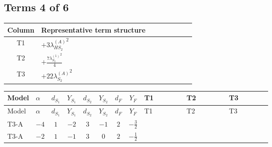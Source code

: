 \documentclass[8pt]{article}
\begin{document}
\begin{landscape}
\subsection*{Terms 4 of 6}
\begin{center}
\begin{tabular}{@{}c >{\raggedright\arraybackslash}p{0.82\linewidth}@{}}
\toprule
Column & Representative term structure \\
\midrule
T1 & \(\displaystyle +3 {\lambda_{HS_2}^{(A)}}^2\) \\
\midrule
T2 & \(\displaystyle +\frac{7 {\lambda_{S_2}^{(1)}}^2}{4}\) \\
\midrule
T3 & \(\displaystyle +22 {\lambda_{S_2}^{(A)}}^2\) \\
\midrule
\bottomrule
\end{tabular}
\end{center}
\smallskip
\tiny
\begin{longtable}{@{}llcccccc >{\raggedright\arraybackslash}p{0.21\linewidth} >{\raggedright\arraybackslash}p{0.21\linewidth} >{\raggedright\arraybackslash}p{0.21\linewidth}@{}}
\toprule
Model & $\alpha$ & $d_{S_1}$ & $Y_{S_1}$ & $d_{S_2}$ & $Y_{S_2}$ & $d_F$ & $Y_F$ & T1 & T2 & T3 \\
\midrule
\endfirsthead
\toprule
Model & $\alpha$ & $d_{S_1}$ & $Y_{S_1}$ & $d_{S_2}$ & $Y_{S_2}$ & $d_F$ & $Y_F$ & T1 & T2 & T3 \\
\midrule
\endhead
T3-A & $-4$ & $1$ & $-2$ & $3$ & $-1$ & $2$ & $-\frac{3}{2}$ & \scriptsize\adjustbox{max width=\linewidth}{$\begin{gathered} +3 {\lambda_{HS_2}^{(A)}}^2\end{gathered}$} & \scriptsize\adjustbox{max width=\linewidth}{$\begin{gathered} +\frac{7 {\lambda_{S_2}^{(1)}}^2}{4}\end{gathered}$} & \scriptsize\adjustbox{max width=\linewidth}{$\begin{gathered} +22 {\lambda_{S_2}^{(A)}}^2\end{gathered}$} \\
\midrule
T3-A & $-2$ & $1$ & $-1$ & $3$ & $0$ & $2$ & $-\frac{1}{2}$ & \scriptsize\adjustbox{max width=\linewidth}{$\begin{gathered} +3 {\lambda_{HS_2}^{(A)}}^2\end{gathered}$} & \scriptsize\adjustbox{max width=\linewidth}{$\begin{gathered} +\frac{7 {\lambda_{S_2}^{(1)}}^2}{4}\end{gathered}$} & \scriptsize\adjustbox{max width=\linewidth}{$\begin{gathered} +22 {\lambda_{S_2}^{(A)}}^2\end{gathered}$} \\

\end{longtable}
\end{landscape}
\end{document}
